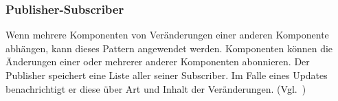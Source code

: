 \subsubsection{Publisher-Subscriber}
Wenn mehrere Komponenten von Veränderungen einer anderen Komponente abhängen, kann dieses Pattern angewendet werden.
Komponenten können die Änderungen einer oder mehrerer anderer Komponenten abonnieren.
Der Publisher speichert eine Liste aller seiner Subscriber.
Im Falle eines Updates benachrichtigt er diese über Art und Inhalt der Veränderungen.
(Vgl.~\cite{buschmann-pattern-oriented-software-architecture})
